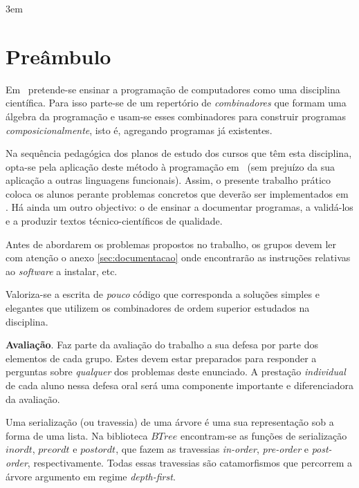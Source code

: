 \documentclass[11pt, a4paper, fleqn]{article}
\newcommand{\Conid}[1]{\mathit{#1}}
\newcommand{\Varid}[1]{\mathit{#1}}
\begin{document}
\sffamily
\setlength{\parindent}{0em}
\emergencystretch 3em
\renewcommand{\baselinestretch}{1.25}

\pagestyle{pagestyle}

\setlength{\parindent}{1em}

\section*{Preâmbulo}

Em \CP\ pretende-se ensinar a progra\-mação de computadores
como uma disciplina científica. Para isso parte-se de um repertório de \emph{combinadores}
que formam uma álgebra da programação %
e usam-se esses combinadores para construir programas \emph{composicionalmente},
isto é, agregando programas já existentes.

Na sequência pedagógica dos planos de estudo dos cursos que têm
esta disciplina, opta-se pela aplicação deste método à programação
em \Haskell\ (sem prejuízo da sua aplicação a outras linguagens
funcionais). Assim, o presente trabalho prático coloca os
alunos perante problemas concretos que deverão ser implementados em
\Haskell. Há ainda um outro objectivo: o de ensinar a documentar
programas, a validá-los e a produzir textos técnico-científicos de
qualidade.

Antes de abordarem os problemas propostos no trabalho, os grupos devem ler
com atenção o anexo \ref{sec:documentacao} onde encontrarão as instruções
relativas ao \emph{software} a instalar, etc.

Valoriza-se a escrita de \emph{pouco} código que corresponda a soluções
simples e elegantes que utilizem os combinadores de ordem superior estudados
na disciplina.

\noindent \textbf{Avaliação}. Faz parte da avaliação do trabalho a sua defesa
por parte dos elementos de cada grupo. Estes devem estar preparados para
responder a perguntas sobre \emph{qualquer} dos problemas deste enunciado.
A prestação \emph{individual} de cada aluno nessa defesa oral será uma componente
importante e diferenciadora da avaliação.


\Problema

Uma serialização (ou travessia) de uma árvore é uma sua representação sob a forma de uma lista.
Na biblioteca \ensuremath{\Conid{BTree}} encontram-se as funções de serialização \ensuremath{\Varid{inordt}}, \ensuremath{\Varid{preordt}} e \ensuremath{\Varid{postordt}},
que fazem as travessias \emph{in-order}, \emph{ pre-order} e \emph{post-order}, respectivamente.
Todas essas travessias são catamorfismos que percorrem a árvore argumento em regime \emph{depth-first}.
\end{document}
